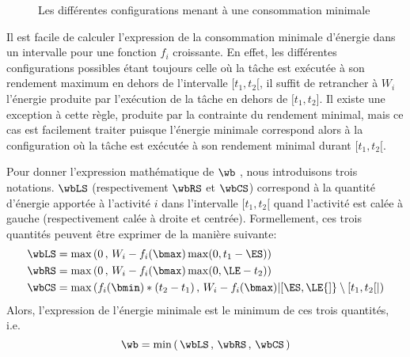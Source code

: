 \begin{figure}[!htb]
{}
  \caption{Les différentes configurations menant à une consommation minimale}
  \label{fig:conso_CECSP}
\end{figure}

Il est facile de calculer l'expression de la consommation minimale
d'énergie dans un intervalle pour une fonction $f_i$ croissante. En
effet, les différentes configurations possibles étant toujours celle
où la tâche est exécutée à son rendement maximum en dehors de
l'intervalle ${[}t_1,t_2{[}$, il suffit de retrancher à $W_i$
l'énergie produite par l'exécution de la tâche en dehors de
${[}t_1,t_2{]}$. Il existe une exception à cette règle, produite par
la contrainte du rendement minimal, mais ce cas est facilement traiter
puisque l'énergie minimale correspond alors à la configuration où la
tâche est exécutée à son rendement minimal durant ${[}t_1,t_2{[}$. 

Pour donner l'expression mathématique de $\wb$ , nous introduisons
trois notations. $\wbLS$ (respectivement $\wbRS$ et $\wbCS$)
correspond à la quantité d'énergie apportée à l'activité $i$ dans
l'intervalle $[t_1,t_2[$ quand l'activité est calée à gauche
(respectivement calée à droite et centrée). Formellement, ces trois
quantités peuvent être exprimer de la manière suivante:
\begin{align}
  \wbLS&= \max\left(0\, ,\, W_i- f_i(\bmax)\max(0,t_1 -
         \ES)\right) \label{eq:LSnrj_CECSP}\\
  \wbRS&= \max\left(0\, ,\, W_i- f_i(\bmax)\max(0,
         \LE-t_2)\right)\label{eq:RSnrj_CECSP}\\
  \wbCS&=\max\left( f_i(\bmin) * (t_2-t_1)\, ,\, W_i -
         f_i(\bmax)|[\ES, \LE{]}\setminus[t_1,t_2[|\right)\label{eq:CSnrj_CECSP}
\end{align}
Alors, l'expression de l'énergie minimale est le minimum de ces trois
quantités, i.e.
\begin{equation}
  \wb=\min\left(\, \wbLS\, ,\,\wbRS\, ,\,\wbCS \, \right)
\end{equation} 

